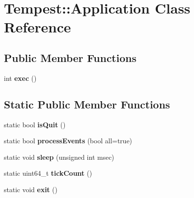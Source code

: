 \hypertarget{class_tempest_1_1_application}{\section{Tempest\+:\+:Application Class Reference}
\label{class_tempest_1_1_application}
}
\subsection*{Public Member Functions}
\begin{DoxyCompactItemize}
\item 
\hypertarget{class_tempest_1_1_application_a33bf2325ad043310bf5a448022b94840}{int {\bfseries exec} ()}\label{class_tempest_1_1_application_a33bf2325ad043310bf5a448022b94840}

\end{DoxyCompactItemize}
\subsection*{Static Public Member Functions}
\begin{DoxyCompactItemize}
\item 
\hypertarget{class_tempest_1_1_application_a48cdb0631b5101bd4919a0eb09026409}{static bool {\bfseries is\+Quit} ()}\label{class_tempest_1_1_application_a48cdb0631b5101bd4919a0eb09026409}

\item 
\hypertarget{class_tempest_1_1_application_a0cb8970087272c1743280fdffba6c602}{static bool {\bfseries process\+Events} (bool all=true)}\label{class_tempest_1_1_application_a0cb8970087272c1743280fdffba6c602}

\item 
\hypertarget{class_tempest_1_1_application_a81bf3bbe33a48ebe232edac7673adb9f}{static void {\bfseries sleep} (unsigned int msec)}\label{class_tempest_1_1_application_a81bf3bbe33a48ebe232edac7673adb9f}

\item 
\hypertarget{class_tempest_1_1_application_a1f76db6e652635e707843e688a91c4da}{static uint64\+\_\+t {\bfseries tick\+Count} ()}\label{class_tempest_1_1_application_a1f76db6e652635e707843e688a91c4da}

\item 
\hypertarget{class_tempest_1_1_application_a3c8a98d6c10a5b054800488df16cdbcb}{static void {\bfseries exit} ()}\label{class_tempest_1_1_application_a3c8a98d6c10a5b054800488df16cdbcb}

\end{DoxyCompactItemize}
